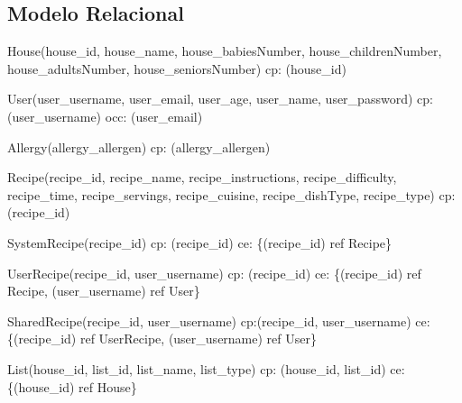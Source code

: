 \subsection{Modelo Relacional}
{\parindent 0pt
	\begin{description}
		\item House(house\_id, house\_name, house\_babiesNumber, house\_childrenNumber, house\_adultsNumber, house\_seniorsNumber) \newline
		\acrshort{cp}: (house\_id) 
		
		\item User(user\_username, user\_email, user\_age, user\_name, user\_password) \newline
		\acrshort{cp}: (user\_username)  \newline
		\acrshort{occ}: (user\_email)
		
		\item Allergy(allergy\_allergen) \newline
		\acrshort{cp}: (allergy\_allergen) 
		
		\item Recipe(recipe\_id, recipe\_name, recipe\_instructions, recipe\_difficulty, recipe\_time, recipe\_servings, recipe\_cuisine, recipe\_dishType, recipe\_type) \newline
		\acrshort{cp}: (recipe\_id) 
		
		\item SystemRecipe(recipe\_id) \newline
		\acrshort{cp}: (recipe\_id) \newline
		\acrshort{ce}: \{(recipe\_id) ref Recipe\}
		
		\item UserRecipe(recipe\_id, user\_username) \newline
		\acrshort{cp}: (recipe\_id) \newline
		\acrshort{ce}: \{(recipe\_id) ref Recipe, (user\_username) ref User\}
		
		\item SharedRecipe(recipe\_id, user\_username) \newline
		\acrshort{cp}:(recipe\_id, user\_username) \newline
		\acrshort{ce}: \{(recipe\_id) ref UserRecipe, (user\_username) ref User\}
		
		\item List(house\_id, list\_id, list\_name, list\_type) \newline
		\acrshort{cp}: (house\_id, list\_id) \newline
		\acrshort{ce}: \{(house\_id) ref House\}
		

\end{description}}
